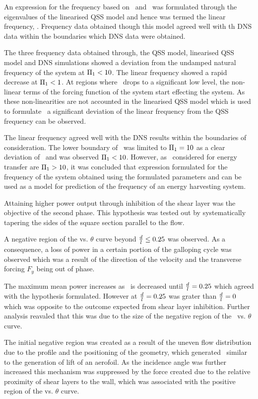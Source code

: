 An expression for the frequency based on \massstiff\ and \massdamp\ was formulated through the eigenvalues of the linearised QSS model and hence was termed the linear frequency,  \freqlin. Frequency data obtained though this model agreed well with th DNS data  within the boundaries which DNS data were obtained.  

The three frequency data obtained through, the QSS model, linearised QSS model and DNS simulations showed a deviation from the undamped natural frequency of the system at $\Pi_1<10$. The linear frequency showed a rapid decrease at $\Pi_1<1$. At regions where \massstiff\ drops to a significant low level, the non-linear terms of the forcing function of the system start effecting the system. As these non-linearities are not accounted in the linearised QSS model which is used to formulate \freqlin\ a significant deviation of the linear frequency from the QSS frequency can be observed.

The linear frequency agreed well with the DNS results within the boundaries of consideration. The lower boundary of \massstiff\ was limited to $\Pi_1=10$ as a clear deviation of \freqlin\ and \freqdns was observed $\Pi_1<10$. However, as \massstiff\ considered for energy transfer are $\Pi_1>10$, it was concluded that expression formulated for the frequency of the system obtained using the formulated parameters \massstiff and \massdamp can be used as a model for prediction of the frequency of an energy harvesting system.  

Attaining higher power output through inhibition of the shear layer was the objective of the second phase. This hypothesis was tested out by systematically tapering the sides of the square section parallel to the flow. 

A negative region of the \cy vs. $\theta$ curve beyond $\frac{d}{l}\leq0.25$ was observed. As a consequence, a loss of power in a certain portion of the galloping cycle was observed which was a result of the direction of the velocity and the transverse forcing $F_{y}$ being out of phase. 

The maximum mean power increases as \ratio\ is decreased until $\frac{d}{l}=0.25$ which agreed with the hypothesis formulated. However at $\frac{d}{l}=0.25$ was grater than $\frac{d}{l}=0$ which was opposite to the outcome expected from shear layer inhibition. Further analysis reavaled that this was due to the size of the negative region of the \cy\ vs. $\theta$ curve.

The initial negative region was created as a result of the uneven flow distribution due to the profile and the positioning of the geometry, which generated \cy\ similar to the generation of lift of an aerofoil. As the incidence angle was further increased this mechanism was suppressed by the force created due to the relative proximity of shear layers to the wall, which was associated with the positive region of the \cy vs. $\theta$ curve. 

